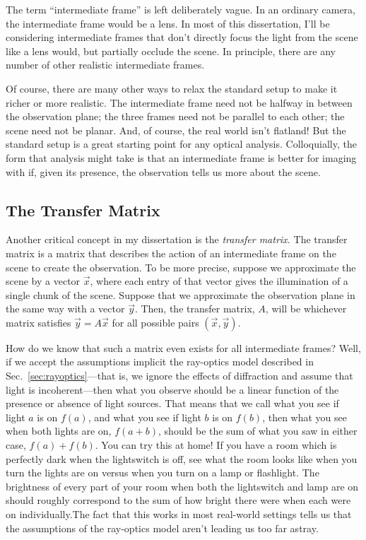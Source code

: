 The term ``intermediate frame'' is left deliberately vague. In an ordinary camera, the intermediate frame would be a lens. In most of this dissertation, I'll be considering intermediate frames that don't directly focus the light from the scene like a lens would, but partially occlude the scene. In principle, there are any number of other realistic intermediate frames.

Of course, there are many other ways to relax the standard setup to make it richer or more realistic. The intermediate frame need not be halfway in between the observation plane; the three frames need not be parallel to each other; the scene need not be planar. And, of course, the real world isn't flatland! But the standard setup is a great starting point for any optical analysis. Colloquially, the form that analysis might take is that an intermediate frame is better for imaging with if, given its presence, the observation tells us more about the scene.

\subsection{The Transfer Matrix} 

Another critical concept in my dissertation is the \emph{transfer matrix.} The transfer matrix is a matrix that describes the action of an intermediate frame on the scene to create the observation. To be more precise, suppose we approximate the scene by a vector $\vec{x}$, where each entry of that vector gives the illumination of a single chunk of the scene. Suppose that we approximate the observation plane in the same way with a vector $\vec{y}$. Then, the transfer matrix, $A$, will be whichever matrix satisfies $\vec{y} = A \vec{x}$ for all possible pairs $(\vec{x}, \vec{y})$. 

How do we know that such a matrix even exists for all intermediate frames? Well, if we accept the assumptions implicit the ray-optics model described in Sec.~\ref{sec:rayoptics}---that is, we ignore the effects of diffraction and assume that light is incoherent---then what you observe should be a linear function of the presence or absence of light sources. That means that we call what you see if light $a$ is on $f(a)$, and what you see if light $b$ is on $f(b)$, then what you see when both lights are on, $f(a+b)$, should be the sum of what you saw in either case, $f(a) + f(b)$. You can try this at home! If you have a room which is perfectly dark when the lightswitch is off, see what the room looks like when you turn the lights are on versus when you turn on a lamp or flashlight. The brightness of every part of your room when both the lightswitch and lamp are on should roughly correspond to the sum of how bright there were when each were on individually.\footnotemark The fact that this works in most real-world settings tells us that the assumptions of the ray-optics model aren't leading us too far astray.

